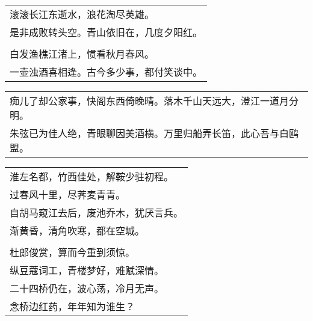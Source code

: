 \nopagebreak%
\nopagebreak%
\noindent\begin{minipage}{\linewidth}
  \vskip-3pt\begin{table}[H]
    \centering
    \begin{tabular}{@{}l@{}}
滚滚长江东逝水，浪花淘尽英雄。\\
是非成败转头空。青山依旧在，几度夕阳红。\\
\\
白发渔樵江渚上，惯看秋月春风。\\
一壶浊酒喜相逢。古今多少事，都付笑谈中。
    \end{tabular}
  \end{table}
\end{minipage}
\vspace{1cm}


\nopagebreak%
\nopagebreak%
\noindent\begin{minipage}{\linewidth}
  \vskip-3pt\begin{table}[H]
    \centering
    \begin{tabular}{@{}l@{}}
痴儿了却公家事，快阁东西倚晚晴。落木千山天远大，澄江一道月分明。\\
朱弦已为佳人绝，青眼聊因美酒横。万里归船弄长笛，此心吾与白鸥盟。
    \end{tabular}
  \end{table}
\end{minipage}
\vspace{1cm}


\nopagebreak%
\nopagebreak%
\noindent\begin{minipage}{\linewidth}
  \vskip-3pt\begin{table}[H]
    \centering
    \begin{tabular}{@{}l@{}}
淮左名都，竹西佳处，解鞍少驻初程。\\
过春风十里，尽荠麦青青。\\
自胡马窥江去后，废池乔木，犹厌言兵。\\
渐黄昏，清角吹寒，都在空城。\\
\\
杜郎俊赏，算而今重到须惊。\\
纵豆蔻词工，青楼梦好，难赋深情。\\
二十四桥仍在，波心荡，冷月无声。\\
念桥边红药，年年知为谁生？
    \end{tabular}
  \end{table}
\end{minipage}
\vspace{1cm}



